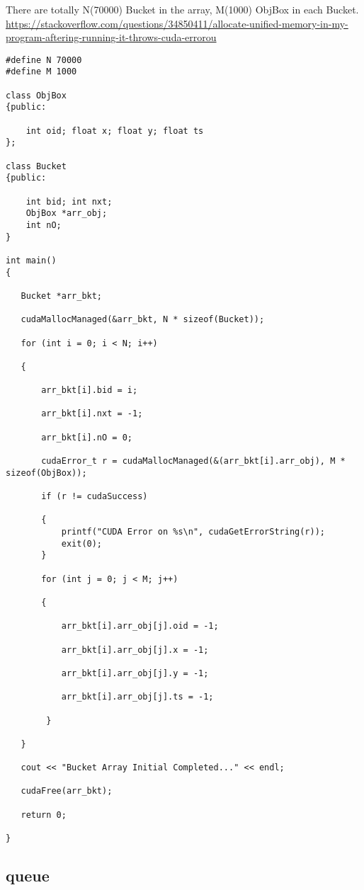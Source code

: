 There are totally N(70000) Bucket in the array, M(1000) ObjBox in each Bucket.
\url{https://stackoverflow.com/questions/34850411/allocate-unified-memory-in-my-program-aftering-running-it-throws-cuda-errorou}
\begin{lstlisting}
#define N 70000
#define M 1000

class ObjBox
{public:

    int oid; float x; float y; float ts
};

class Bucket
{public:

    int bid; int nxt; 
    ObjBox *arr_obj; 
    int nO;
}

int main()
{

   Bucket *arr_bkt;

   cudaMallocManaged(&arr_bkt, N * sizeof(Bucket));

   for (int i = 0; i < N; i++)

   {

       arr_bkt[i].bid = i; 

       arr_bkt[i].nxt = -1;

       arr_bkt[i].nO = 0;

       cudaError_t r = cudaMallocManaged(&(arr_bkt[i].arr_obj), M * sizeof(ObjBox));

       if (r != cudaSuccess)

       {
           printf("CUDA Error on %s\n", cudaGetErrorString(r));
           exit(0);
       }

       for (int j = 0; j < M; j++)

       {

           arr_bkt[i].arr_obj[j].oid = -1;

           arr_bkt[i].arr_obj[j].x = -1;

           arr_bkt[i].arr_obj[j].y = -1;

           arr_bkt[i].arr_obj[j].ts = -1;

        }

   }

   cout << "Bucket Array Initial Completed..." << endl;

   cudaFree(arr_bkt);

   return 0;

}
\end{lstlisting}

\subsection{queue}

